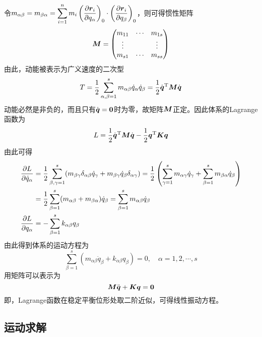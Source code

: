 令$\displaystyle m_{\alpha\beta} = m_{\beta\alpha} = \sum_{i=1}^n m_i \left(\frac{\partial \boldsymbol{r}_i}{\partial q_\alpha}\right)_0 \cdot \left(\frac{\partial \boldsymbol{r}_i}{\partial q_\beta}\right)_0$，则可得惯性矩阵
\begin{equation*}
	\boldsymbol{M} = \begin{pmatrix} m_{11} & \cdots & m_{1s} \\ \vdots & & \vdots \\ m_{s1} & \cdots & m_{ss} \end{pmatrix}
\end{equation*}
由此，动能被表示为广义速度的二次型
\begin{equation}
	T = \frac12 \sum_{\alpha,\beta=1}^s m_{\alpha\beta} \dot{q}_\alpha \dot{q}_\beta = \frac12 \dot{\boldsymbol{q}}^{\mathrm{T}} \boldsymbol{M} \dot{\boldsymbol{q}}
\end{equation}
动能必然是非负的，而且只有$\dot{\boldsymbol{q}}=\boldsymbol{0}$时为零，故矩阵$\boldsymbol{M}$正定。因此体系的Lagrange函数为
\begin{equation*}
	L = \frac12 \dot{\boldsymbol{q}}^{\mathrm{T}} \boldsymbol{M} \dot{\boldsymbol{q}} - \frac12 \boldsymbol{q}^{\mathrm{T}} \boldsymbol{K} \boldsymbol{q}
\end{equation*}
由此可得
\begin{align*}
	\frac{\partial L}{\partial \dot{q}_\alpha} & = \frac12 \sum_{\beta,\gamma=1}^s (m_{\beta\gamma}\delta_{\alpha\beta} \dot{q}_\gamma + m_{\beta\gamma}\dot{q}_\beta \delta_{\alpha\gamma}) = \frac12 \left(\sum_{\gamma=1}^s m_{\alpha\gamma} \dot{q}_\gamma + \sum_{\beta=1}^s m_{\beta\alpha} \dot{q}_\beta\right) \\
	& = \frac12 \sum_{\beta=1}^s (m_{\alpha\beta} + m_{\beta\alpha}) \dot{q}_\beta = \sum_{\beta=1}^s m_{\alpha\beta} \dot{q}_\beta \\
	\frac{\partial L}{\partial q_\alpha} & = -\sum_{\beta=1}^s k_{\alpha\beta} q_\beta
\end{align*}
由此得到体系的运动方程为
\begin{equation*}
	\sum_{\beta=1}^s (m_{\alpha\beta} \ddot{q}_\beta + k_{\alpha\beta} q_\beta) = 0,\quad \alpha=1,2,\cdots,s
\end{equation*}
用矩阵可以表示为
\begin{equation}
	\boldsymbol{M} \ddot{\boldsymbol{q}} + \boldsymbol{K} \boldsymbol{q} = \boldsymbol{0}
	\label{多自由度微振动体系的运动方程}
\end{equation}
即，Lagrange函数在稳定平衡位形处取二阶近似，可得线性振动方程。

\subsection{运动求解}

